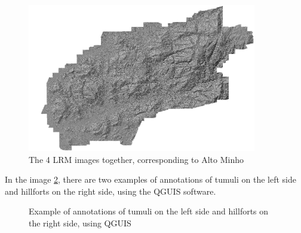 \begin{figure}[H]
\centering
\includegraphics[width=10cm]{images/LRMfinal.png}
\caption{The 4 LRM images together, corresponding to Alto Minho}
\label{fig:4lrmsjuntas}
\end{figure}
In the image \ref{Example of annotations of tumuli on the left side and hillforts on the right side, using QGUIS}, there are two examples of annotations of tumuli on the left side and hillforts on the right side, using the QGUIS software.
\begin{figure}[H]
    \centering
    \qquad
    \caption{Example of annotations of tumuli on the left side and hillforts on the right side, using QGUIS}%
    \label{Example of annotations of tumuli on the left side and hillforts on the right side, using QGUIS}
\end{figure}



